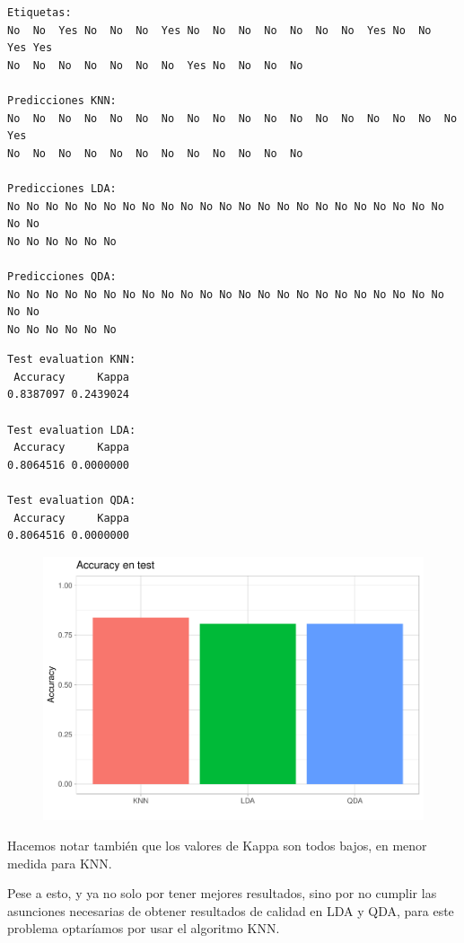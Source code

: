 \begin{verbatim}
Etiquetas:
No  No  Yes No  No  No  Yes No  No  No  No  No  No  No  Yes No  No  Yes Yes
No  No  No  No  No  No  No  Yes No  No  No  No 

Predicciones KNN:
No  No  No  No  No  No  No  No  No  No  No  No  No  No  No  No  No  No  Yes
No  No  No  No  No  No  No  No  No  No  No  No 

Predicciones LDA:
No No No No No No No No No No No No No No No No No No No No No No No No No
No No No No No No

Predicciones QDA:
No No No No No No No No No No No No No No No No No No No No No No No No No
No No No No No No
\end{verbatim}

\vspace{\baselineskip}

\begin{verbatim}
Test evaluation KNN:
 Accuracy     Kappa 
0.8387097 0.2439024  

Test evaluation LDA:
 Accuracy     Kappa 
0.8064516 0.0000000 

Test evaluation QDA:
 Accuracy     Kappa 
0.8064516 0.0000000 
\end{verbatim}

\begin{figure}[H]\center\includegraphics[width=.9\linewidth]{img/Clasificacion_files/figure-latex/unnamed-chunk-33-1}\caption{}\end{figure}

Hacemos notar también que los valores de Kappa son todos bajos, en menor medida para KNN.

\vspace{\baselineskip}

Pese a esto, y ya no solo por tener mejores resultados, sino por no cumplir las asunciones necesarias de obtener resultados de calidad en LDA y QDA, para este problema optaríamos por usar el algoritmo KNN.

